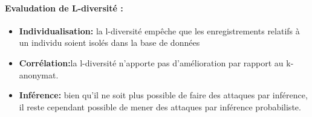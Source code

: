 \paragraph{Evaludation de L-diversité : }
\begin{itemize}
    \item \textbf{Individualisation:} la l-diversité empêche que les enregistrements relatifs à un individu soient isolés dans la base de données 

   \item \textbf{Corrélation:}la l-diversité n’apporte pas d’amélioration par rapport au k-anonymat.  

   \item \textbf{Inférence:} bien qu’il ne soit plus possible de faire des attaques par inférence, il reste cependant possible de mener des attaques par inférence probabiliste. 
\end{itemize}